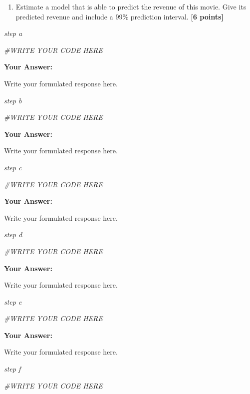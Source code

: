 \documentclass[
]{article}
\newenvironment{Shaded}{\begin{snugshade}}{\end{snugshade}}
\newcommand{\CommentTok}[1]{\textcolor[rgb]{0.56,0.35,0.01}{\textit{#1}}}
\providecommand{\tightlist}{%
  \setlength{\itemsep}{0pt}\setlength{\parskip}{0pt}}
\begin{document}
\begin{enumerate}
\def\labelenumi{\alph{enumi}.}
\setcounter{enumi}{5}
\tightlist
\item
  Estimate a model that is able to predict the revenue of this movie.
  Give its predicted revenue and include a 99\% prediction interval.
  \textbf{[6 points]}
\end{enumerate}

\emph{step a}

\begin{Shaded}
\begin{Highlighting}[]
\CommentTok{\#WRITE YOUR CODE HERE}
\end{Highlighting}
\end{Shaded}

\textbf{Your Answer:}

Write your formulated response here.

\emph{step b}

\begin{Shaded}
\begin{Highlighting}[]
\CommentTok{\#WRITE YOUR CODE HERE}
\end{Highlighting}
\end{Shaded}

\textbf{Your Answer:}

Write your formulated response here.

\emph{step c}

\begin{Shaded}
\begin{Highlighting}[]
\CommentTok{\#WRITE YOUR CODE HERE}
\end{Highlighting}
\end{Shaded}

\textbf{Your Answer:}

Write your formulated response here.

\emph{step d}

\begin{Shaded}
\begin{Highlighting}[]
\CommentTok{\#WRITE YOUR CODE HERE}
\end{Highlighting}
\end{Shaded}

\textbf{Your Answer:}

Write your formulated response here.

\emph{step e}

\begin{Shaded}
\begin{Highlighting}[]
\CommentTok{\#WRITE YOUR CODE HERE}
\end{Highlighting}
\end{Shaded}

\textbf{Your Answer:}

Write your formulated response here.

\emph{step f}

\begin{Shaded}
\begin{Highlighting}[]
\CommentTok{\#WRITE YOUR CODE HERE}
\end{Highlighting}
\end{Shaded}
\end{document}
